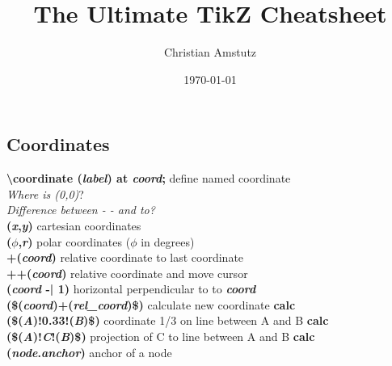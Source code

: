 \documentclass[10pt]{article}
\title{The Ultimate TikZ Cheatsheet}
\author{Christian Amstutz}
\date{\today}
\newcommand{\tikzcmd}[1]{\textbf{#1}}
\newcommand{\tikzparam}[1]{\textbf{\emph{#1}}}
\newcommand{\tikzlib}[1]{\textbf{#1}}
\begin{document}
    \maketitle

    \begin{multicols}{2}

        \section{Coordinates}
        \tikzcmd{\textbackslash coordinate (\tikzparam{label}) at \tikzparam{coord};} define named coordinate\\
        \emph{Where is (0,0)}?\\
        \emph{Difference between - - and to?}\\
        \tikzcmd{(\tikzparam{x},\tikzparam{y})} cartesian coordinates\\
        \tikzcmd{(\tikzparam{$\phi$},\tikzparam{r})} polar coordinates ($\phi$ in degrees)\\
        \tikzcmd{+(\tikzparam{coord})} relative coordinate to last coordinate\\
        \tikzcmd{++(\tikzparam{coord})} relative coordinate and move cursor\\
        \tikzcmd{(\tikzparam{coord} -| 1)} horizontal perpendicular to to \tikzparam{coord}\\
        \tikzcmd{(\$(\tikzparam{coord})+(\tikzparam{rel\_coord})\$)} calculate new coordinate \tikzlib{calc}\\
        \tikzcmd{(\$(\tikzparam{A})!0.33!(\tikzparam{B})\$)} coordinate 1/3 on line between A and B \tikzlib{calc}\\
        \tikzcmd{(\$(\tikzparam{A})!\tikzparam{C}!(\tikzparam{B})\$)} projection of C to line between A and B \tikzlib{calc}\\
        \tikzcmd{(\tikzparam{node}.\tikzparam{anchor})} anchor of a node


\end{multicols}
\end{document}
